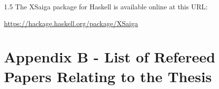 \documentclass[fleqn, oneside, 12pt]{book}
\theoremstyle{definitionsty}
\newcommand{\uwinonehalfspacelen}{1.5}
\newcommand{\uwindefaultspacelen}{\uwinonehalfspacelen}
\newenvironment{uwindefaultspaceenv}%
{\begin{spacing}{\uwindefaultspacelen}}%
	{\end{spacing}}
\begin{document}
\begin{uwindefaultspaceenv}
\noindent The XSaiga package for Haskell is available online at this URL:

{\noindent \small \url{https://hackage.haskell.org/package/XSaiga}}

%
%
%
%
%
%


\section*{Appendix B - List of Refereed Papers Relating to the Thesis}


\end{uwindefaultspaceenv}
\end{document}
